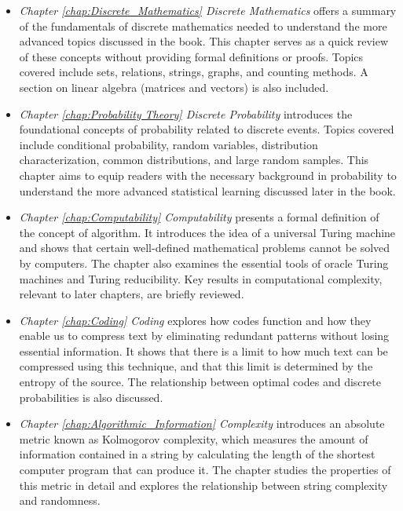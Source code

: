 \begin{itemize}

\item \emph{Chapter \ref{chap:Discrete_Mathematics} Discrete Mathematics}  offers a summary of the fundamentals of discrete mathematics needed to understand the more advanced topics discussed in the book. This chapter serves as a quick review of these concepts without providing formal definitions or proofs. Topics covered include sets, relations, strings, graphs, and counting methods. A section on linear algebra (matrices and vectors) is also included.

\item \emph{Chapter \ref{chap:Probability Theory} Discrete Probability} introduces the foundational concepts of probability related to discrete events. Topics covered include conditional probability, random variables, distribution characterization, common distributions, and large random samples. This chapter aims to equip readers with the necessary background in probability to understand the more advanced statistical learning discussed later in the book.

\item \emph{Chapter \ref{chap:Computability} Computability} presents a formal definition of the concept of algorithm. It introduces the idea of a universal Turing machine and shows that certain well-defined mathematical problems cannot be solved by computers. The chapter also examines the essential tools of oracle Turing machines and Turing reducibility. Key results in computational complexity, relevant to later chapters, are briefly reviewed.

\item \emph{Chapter \ref{chap:Coding} Coding} explores how codes function and how they enable us to compress text by eliminating redundant patterns without losing essential information. It shows that there is a limit to how much text can be compressed using this technique, and that this limit is determined by the entropy of the source. The relationship between optimal codes and discrete probabilities is also discussed.

\item \emph{Chapter \ref{chap:Algorithmic_Information} Complexity} introduces an absolute metric known as Kolmogorov complexity, which measures the amount of information contained in a string by calculating the length of the shortest computer program that can produce it. The chapter studies the properties of this metric in detail and explores the relationship between string complexity and randomness.


\end{itemize}
